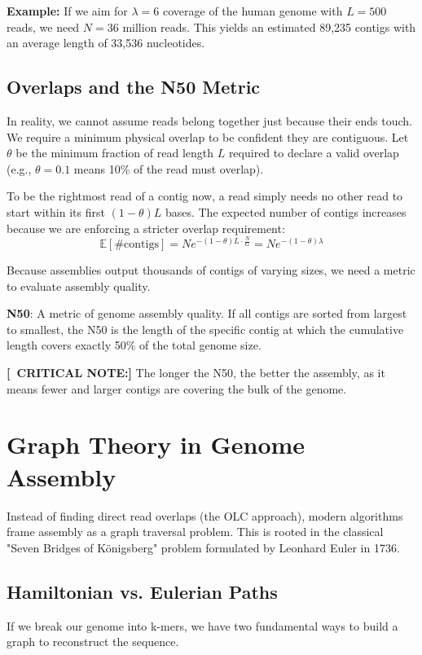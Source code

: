 \documentclass[11pt,a4paper]{article}
\newenvironment{important}{
    \vspace{1em}
    \begin{tcolorbox}[colback=blue!5!white, colframe=blue!75!black, boxrule=1pt, arc=4pt, left=10pt, right=10pt, top=10pt, bottom=10pt]
}{
    \end{tcolorbox}
    \vspace{1em}
}
\newcommand{\sta}{\textbf{[\textasteriskcentered\ CRITICAL NOTE:] }}
\begin{document}
\textbf{Example:} If we aim for $\lambda=6$ coverage of the human genome with $L=500$ reads, we need $N=36$ million reads. This yields an estimated 89,235 contigs with an average length of 33,536 nucleotides. 

\subsection{Overlaps and the N50 Metric}

In reality, we cannot assume reads belong together just because their ends touch. We require a minimum physical overlap to be confident they are contiguous. 
Let $\theta$ be the minimum fraction of read length $L$ required to declare a valid overlap (e.g., $\theta = 0.1$ means 10\% of the read must overlap). 

To be the rightmost read of a contig now, a read simply needs no other read to start within its first $(1 - \theta)L$ bases. The expected number of contigs increases because we are enforcing a stricter overlap requirement:
\[ \mathbb{E}[\# \text{contigs}] = N e^{-(1 - \theta)L \cdot \frac{N}{G}} = N e^{-(1 - \theta)\lambda} \]

Because assemblies output thousands of contigs of varying sizes, we need a metric to evaluate assembly quality.
\begin{important}
\textbf{N50}: A metric of genome assembly quality. If all contigs are sorted from largest to smallest, the N50 is the length of the specific contig at which the cumulative length covers exactly 50\% of the total genome size.
\end{important}
\sta The longer the N50, the better the assembly, as it means fewer and larger contigs are covering the bulk of the genome.

\section{Graph Theory in Genome Assembly}

Instead of finding direct read overlaps (the OLC approach), modern algorithms frame assembly as a graph traversal problem. This is rooted in the classical "Seven Bridges of Königsberg" problem formulated by Leonhard Euler in 1736.

\subsection{Hamiltonian vs. Eulerian Paths}
If we break our genome into k-mers, we have two fundamental ways to build a graph to reconstruct the sequence.
\end{document}
